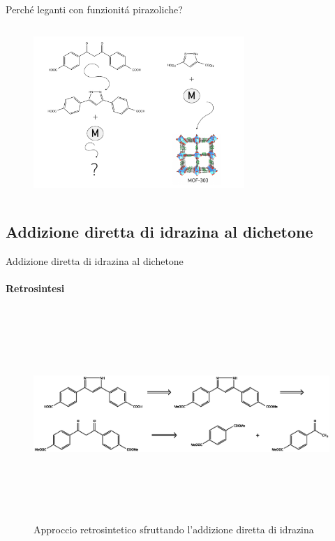 \documentclass[aspectration=169]{beamer}
\begin{document}
\begin{frame}{Perché leganti con funzionitá pirazoliche?}
\begin{columns}
		\hspace{-0.5cm}
		\begin{column}{0.7\textwidth}
			\begin{figure}[h]
				\includegraphics[width=8cm,keepaspectratio]{illustration/drawing2.pdf}
			\end{figure}
		\end{column}
	\end{columns}
\end{frame}

\subsection{Addizione diretta di idrazina al dichetone}
\begin{frame}{Addizione diretta di idrazina al dichetone}
	\framesubtitle{Retrosintesi}
	\begin{figure}[h]
		\centering
		\includegraphics[width=14cm,height=8cm,keepaspectratio]{../Structures/pyr-retro.eps}
		\caption{Approccio retrosintetico sfruttando l'addizione diretta di idrazina}
	\end{figure}
\end{frame}
\end{document}
